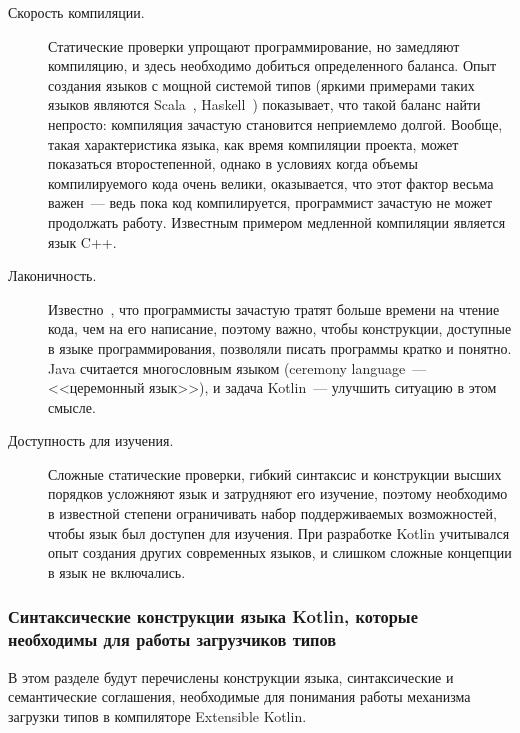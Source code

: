 \begin{description}
	\item[Скорость компиляции.] Статические проверки упрощают программирование, но замедляют компиляцию, и здесь необходимо добиться определенного баланса. Опыт создания языков с мощной системой типов (яркими примерами таких языков являются Scala~\cite{scala-spec}, Haskell~\cite{haskell98}) показывает, что такой баланс найти непросто: компиляция зачастую становится неприемлемо долгой.
	Вообще, такая характеристика языка, как время компиляции проекта, может показаться второстепенной, однако в условиях когда объемы компилируемого кода очень велики, оказывается, что этот фактор весьма важен~--- ведь пока код компилируется, программист зачастую не может продолжать работу. Известным примером медленной компиляции является язык C++.

	\item[Лаконичность.] Известно~\cite{codecomplete}, что программисты зачастую тратят больше времени на чтение кода, чем на его написание, поэтому важно, чтобы конструкции, доступные в языке программирования, позволяли писать программы кратко и понятно.
	Java считается многословным языком (ceremony language~--- <<церемонный язык>>), и задача Kotlin~--- улучшить ситуацию в этом смысле.

	\item[Доступность для изучения.] Сложные статические проверки, гибкий синтаксис и конструкции высших порядков усложняют язык и затрудняют его изучение, поэтому необходимо в известной степени ограничивать набор поддерживаемых возможностей, чтобы язык был доступен для изучения. При разработке Kotlin учитывался опыт создания других современных языков, и слишком сложные концепции в язык не включались.
\end{description}

\subsubsection{Синтаксические конструкции языка Kotlin, которые необходимы для работы загрузчиков типов}

В этом разделе будут перечислены конструкции языка, синтаксические и семантические соглашения, необходимые для понимания работы механизма загрузки типов в компиляторе Extensible Kotlin.

